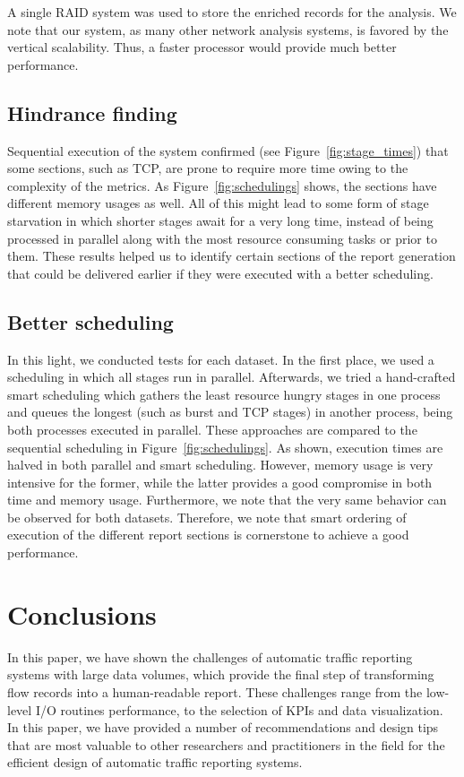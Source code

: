 \documentclass[AMA,STIX1COL]{WileyNJD-v2}
\begin{document}
A single RAID system was used to store the enriched records for the analysis. We note that our system, as many other network analysis systems, is favored by the vertical scalability. Thus, a faster processor would provide much better performance.

\subsection{Hindrance finding}
Sequential execution of the system confirmed (see Figure~\ref{fig:stage_times}) that some sections, such as TCP, are prone to require more time owing to the complexity of the metrics. As Figure~\ref{fig:schedulings} shows, the sections have different memory usages as well. All of this might lead to some form of stage starvation in which shorter stages await for a very long time, instead of being processed in parallel along with the most resource consuming tasks or prior to them.
These results helped us to identify certain sections of the report generation that could be delivered earlier if they were executed with a better scheduling.  %

\subsection{Better scheduling}

In this light, we conducted tests for each dataset. In the first place, we used a scheduling in which all stages run in parallel. Afterwards, we tried a hand-crafted smart scheduling which gathers the least resource hungry stages in one process and queues the longest (such as burst and TCP stages) in another process, being both processes executed in parallel. These approaches are compared to the sequential scheduling in Figure~\ref{fig:schedulings}. As shown, execution times are halved in both parallel and smart scheduling. However, memory usage is very intensive for the former, while the latter provides a good compromise in both time and memory usage. Furthermore, we note that the very same behavior can be observed for both datasets. Therefore, we note that smart ordering of execution of the different report sections is cornerstone to achieve a good performance.

\section{Conclusions}
\label{sec:conclusions}
In this paper, we have shown the challenges of automatic traffic reporting systems with large data volumes, which provide the final step of transforming flow records into a human-readable report. These challenges range from the low-level I/O routines performance, to the selection of KPIs and data visualization. In this paper, we have provided a number of recommendations and design tips that are most valuable to other researchers and practitioners in the field for the efficient design of automatic traffic reporting systems.  %
\end{document}
